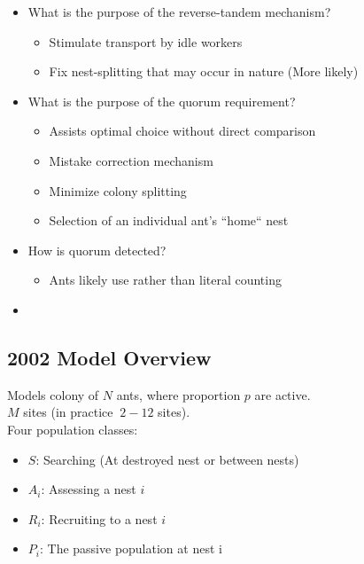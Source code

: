\documentclass[letterpaper]{article}
\makeatletter
\def\mcolor#1#{\@mcolor{#1}}
\def\@mcolor#1#2#3{%
  \protect\leavevmode
  \begingroup
    \color#1{#2}#3%
  \endgroup
}
\newcommand{\sitem}[1]
{
    \begin{itemize}
        \item #1
    \end{itemize}
}
\makeatother
\begin{document}

      \begin{itemize}
          \item What is the purpose of the reverse-tandem mechanism?
              \sitem{Stimulate transport by idle workers}
              \sitem{Fix nest-splitting that may occur in nature (More likely)}
          \item What is the purpose of the quorum requirement?
              \sitem{Assists optimal choice without direct comparison}
              \sitem{Mistake correction mechanism}
              \sitem{Minimize colony splitting}
              \sitem{Selection of an individual ant's ``home`` nest}
          \item How is quorum detected?
              \sitem{Ants likely use  rather than literal counting}
          \item {}
      \end{itemize}

  \subsection{2002 Model Overview}
      Models colony of $N$ ants, where proportion $p$ are active. \\
      $M$ sites (in practice $~2-12$ sites). \\
      Four population classes: 
      \begin{itemize}
          \item $S$: Searching (At destroyed nest or between nests) 
          \item $A_i$: Assessing a nest $i$ 
          \item $R_i$: Recruiting to a nest $i$ 
          \item $P_i$: The passive population at nest i 
      \end{itemize}
\end{document}
